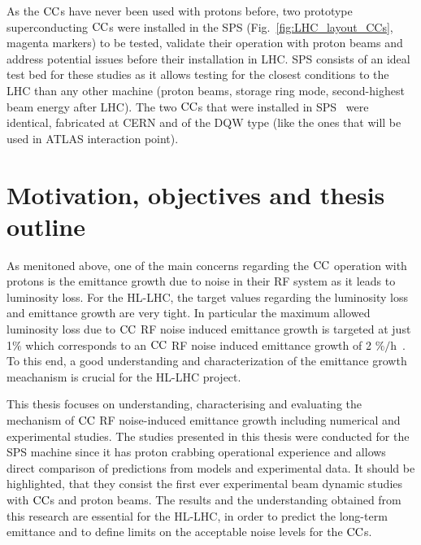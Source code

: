 As the ${\mathrm{CC}}$s have never been used with protons before, two prototype superconducting ${\mathrm{CC}}$s were installed in the SPS (Fig.~\ref{fig:LHC_layout_CCs}, magenta markers) to be tested, validate their operation with proton beams and address potential issues before their installation in LHC. SPS consists of an ideal test bed for these studies as it allows testing for the closest conditions to the LHC than any other machine (proton beams, storage ring mode, second-highest beam energy after LHC). The two ${\mathrm{CC}}$s that were installed in SPS~\cite{Zanoni:2017} were identical, fabricated at CERN and of the DQW type (like the ones that will be used in ATLAS interaction point).


\section{Motivation, objectives and thesis outline}

As menitoned above, one of the main concerns regarding the ${\mathrm{CC}}$ operation with protons is the emittance growth due to noise in their RF system as it leads to luminosity loss. For the HL-LHC, the target values regarding the luminosity loss and emittance growth are very tight. In particular the maximum allowed luminosity loss due to ${\mathrm{CC}}$ RF noise induced emittance growth is targeted at just 1$\%$ which corresponds to an ${\mathrm{CC}}$ RF noise induced emittance growth of 2 $\mathrm{\%/h}$~\cite{MedinaMedrano:2301928, CC_lumi_limits_philippe, CC_lumi_limits_ilias}. To this end, a good understanding and characterization of the emittance growth meachanism is crucial for the HL-LHC project.

This thesis focuses on understanding, characterising and evaluating the mechanism of ${\mathrm{CC}}$ RF noise-induced emittance growth including numerical and experimental studies. The studies presented in this thesis were conducted for the SPS machine since it has proton crabbing operational experience and allows direct comparison of predictions from models and experimental data. It should be highlighted, that they consist the first ever experimental beam dynamic studies with ${\mathrm{CC}}$s and proton beams. The results and the understanding obtained from this research are essential for the HL-LHC, in order to predict the long-term emittance and to define limits on the acceptable noise levels for the ${\mathrm{CC}}$s.

